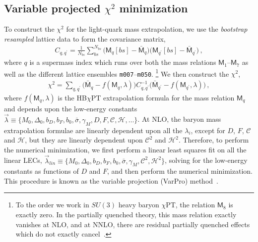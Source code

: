 \documentclass[twocolumn,nofootinbib,prd,aps,superscriptaddress,tightenlines]{revtex4}
\def\mreln{ \mathsf{M} }
\def\mc#1{{\mathcal{#1}}}
\def\D{\Delta}
\def\s{\sigma}
\def\g{\gamma}
\def\l{\lambda}
\begin{document}
\subsection{Variable projected $\chi^2$ minimization}
%
To construct the $\chi^2$ for the light-quark mass extrapolation, we use the \textit{bootstrap resampled} lattice data to form the covariance matrix,
\begin{align}
&C_{q,q^\prime} = \frac{1}{N_{bs}} \sum_{bs}^{N_{bs}} \Big( \mreln_q[bs] - \bar{\mreln}_q \Big) 
	\Big( \mreln_{q^\prime}[bs] - \bar{\mreln}_{q^\prime} \Big)\, ,&
\end{align}
where $q$ is a supermass index which runs over both the mass relations $\mreln_1$--$\mreln_7$ as well as the different lattice ensembles \texttt{m007}--\texttt{m050}.%
\footnote{To the order we work in $SU(3)$ heavy baryon $\chi$PT, the relation $\mreln_8$ is exactly zero.  In the partially quenched theory, this mass relation exactly vanishes at NLO, and at NNLO, there are residual partially quenched effects which do not exactly cancel~\cite{Tiburzi:2004rh}.} 
%
We then construct the $\chi^2$,
\begin{align}
&\chi^2 = \sum_{q,q^\prime} \Big( \bar{\mreln}_q - f(\mreln_q,\lambda) \Big) C_{q,q^\prime}^{-1} \Big( \bar{\mreln}_{q^\prime} - f(\mreln_{q^\prime},\lambda) \Big)\, ,&
\end{align}
where $f(\mreln_q,\lambda)$ is the HB$\chi$PT extrapolation formula for the mass relation $\mreln_q$ and depends upon the low-energy constants $\vec{\l} \equiv \{M_0,\D_0, b_D,b_F, b_0, \bar{\s},\g_M,D,F,\mc{C},\mc{H},\dots\}$. At NLO, the baryon mass extrapolation formulae are linearly dependent upon all the $\l_i$, except for $D$, $F$, $\mc{C}$ and $\mc{H}$, but they  are linearly dependent upon $\mc{C}^2$ and $\mc{H}^2$.  Therefore, to perform the numerical minimization, we first perform a linear least squares fit on all the linear LECs, $\vec{\l}_{lin} \equiv \{M_0,\D_0, b_D,b_F, b_0, \bar{\s},\g_M,\mc{C}^2,\mc{H}^2\}$, solving for the low-energy constants as functions of $D$ and $F$, and then perform the numerical minimization.  This procedure is known as the variable projection (VarPro) method~\cite{VarPro}.
\end{document}
